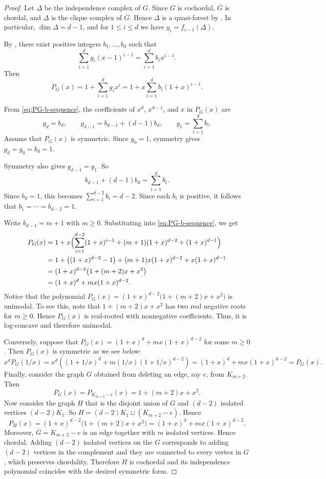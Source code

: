\documentclass[12pt]{amsart}
\theoremstyle{plain}
\theoremstyle{definition}
\begin{document}
\begin{proof}
Let $\Delta$ be the independence complex of $G$. Since $G$ is
cochordal, $\overline{G}$ is chordal, and $\Delta$ is the clique complex of
$\overline{G}$. Hence $\Delta$ is a quasi-forest by
\cite[Lemma~1.1]{HHZ-CM-chordal}. In particular, $\dim \Delta=d-1$, and for
$1\le i\le d$ we have \(g_i=f_{i-1}(\Delta)\).

By \cite[Theorem~1.1]{Combinatorica_cochordal}, there exist positive integers $b_1,\dots,b_d$ such that
\[
\sum_{i=1}^d g_i(x-1)^{i-1}=\sum_{i=1}^d b_i x^{i-1}.
\]
Then
\begin{equation}\label{eq:PG-b-sequence}
P_G(x)=1+\sum_{i=1}^d g_ix^i=1+x\sum_{i=1}^d b_i(1+x)^{i-1}.
\end{equation}

From \eqref{eq:PG-b-sequence}, the coefficients of $x^d$, $x^{d-1}$, and $x$
in $P_G(x)$ are
\[
g_d=b_d,\qquad
g_{d-1}=b_{d-1}+(d-1)b_d,\qquad
g_1=\sum_{i=1}^d b_i.
\]
Assume that $P_G(x)$ is symmetric. Since $g_0=1$, symmetry gives $g_d=g_0=b_d=1$. 

Symmetry also gives $g_{d-1}=g_1$. So
\[
b_{d-1}+(d-1)b_d=\sum_{i=1}^d b_i.
\]
Since $b_d=1$, this becomes \(\sum_{i=1}^{d-2} b_i=d-2\).
Since each $b_i$ is positive, it follows that \(b_1=\cdots=b_{d-2}=1\).

Write $b_{d-1}=m+1$ with $m\ge 0$. Substituting into
\eqref{eq:PG-b-sequence}, we get
\[
\begin{aligned}
P_G(x)
&=1+x\Bigl(\sum_{i=1}^{d-2}(1+x)^{i-1}+(m+1)(1+x)^{d-2}+(1+x)^{d-1}\Bigr)\\
&=1+\bigl((1+x)^{d-2}-1\bigr)+(m+1)x(1+x)^{d-2}+x(1+x)^{d-1}\\
&=(1+x)^{d-2}\bigl(1+(m+2)x+x^2\bigr)\\
&=(1+x)^d+mx(1+x)^{d-2}.
\end{aligned}
\]
Notice that  the polynomial $P_G(x)= (1+x)^{d-2}\bigl(1+(m+2)x+x^2\bigr)$ is unimodal. To see this, note that $1+(m+2)x+x^2$ has two real negative roots for $m\ge 0$. Hence $P_G(x)$ is real-rooted with nonnegative coefficients. Thus, it is log-concave and therefore unimodal.


Conversely, suppose that \(P_G(x)=(1+x)^d+mx(1+x)^{d-2}\)
for some $m\ge 0$. Then  $P_G(x)$ is symmetric as we see below:
\[
x^dP_G(1/x)
= x^d\left((1+1/x)^d+m(1/x)(1+1/x)^{d-2}\right)
= (1+x)^d+mx(1+x)^{d-2}
= P_G(x).
\]
Finally, consider the graph $G$ obtained from deleting an edge, say $e$, from $K_{m+2}$. Then
\[
P_G(x)=P_{K_{m+2}-e}(x)=1+(m+2)x+x^2.
\]
Now consider the graph $H$ that is the disjoint union of $G$ and $(d-2)$ isolated vertices $(d-2)K_1$. So $H=(d-2)K_1 \sqcup (K_{m+2}-e)$. 
Hence
\[
P_{H}(x)
=(1+x)^{d-2}\bigl(1+(m+2)x+x^2\bigr)
=(1+x)^d+mx(1+x)^{d-2}.
\]
Moreover, $\overline{G}=\overline{K_{m+2}-e}$ is an edge together with $m$ isolated
vertices. Hence chordal. Adding $(d-2)$ isolated vertices on the $G$
corresponds to adding $(d-2)$  vertices in the complement and they are connected to every vertex in $G$, which
preserves chordality. Therefore $H$ is cochordal and its independence polynomial coincides with the desired symmetric form.
\end{proof}
\end{document}
